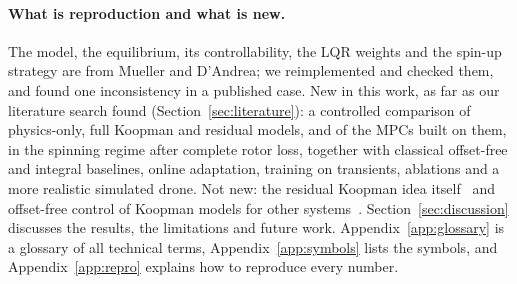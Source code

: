 \paragraph{What is reproduction and what is new.} The model, the equilibrium, its controllability, the LQR weights and the spin-up strategy are from Mueller and D'Andrea; we reimplemented and checked them, and found one inconsistency in a published case. New in this work, as far as our literature search found (Section~\ref{sec:literature}): a controlled comparison of physics-only, full Koopman and residual models, and of the MPCs built on them, in the spinning regime after complete rotor loss, together with classical offset-free and integral baselines, online adaptation, training on transients, ablations and a more realistic simulated drone. Not new: the residual Koopman idea itself~\cite{todde2026residual} and offset-free control of Koopman models for other systems~\cite{schimperna2025offsetfree}.
Section~\ref{sec:discussion} discusses the results, the limitations and future work. Appendix~\ref{app:glossary} is a glossary of all technical terms, Appendix~\ref{app:symbols} lists the symbols, and Appendix~\ref{app:repro} explains how to reproduce every number.

